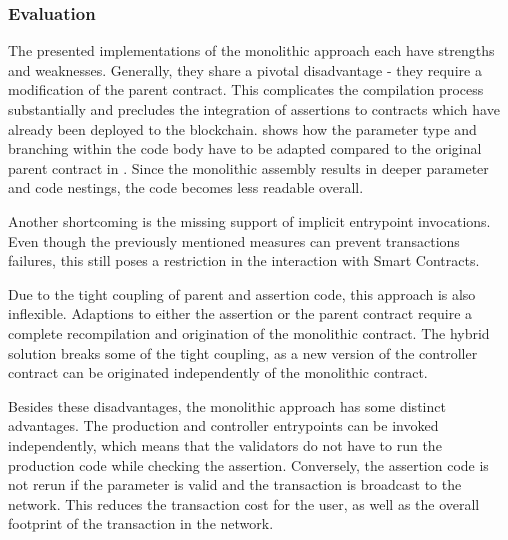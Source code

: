 \subsubsection{Evaluation}
The presented implementations of the monolithic approach each have strengths and weaknesses. Generally, they share a pivotal disadvantage - they require a modification of the parent contract. This complicates the compilation process substantially and precludes the integration of assertions to contracts which have already been deployed to the blockchain.  shows how the parameter type and branching within the code body have to be adapted compared to the original parent contract in . Since the monolithic assembly results in deeper parameter and code nestings, the code becomes less readable overall.


Another shortcoming is the missing support of implicit entrypoint invocations. Even though the previously mentioned measures can prevent transactions failures, this still poses a restriction in the interaction with Smart Contracts. 

Due to the tight coupling of parent and assertion code, this approach is also inflexible. Adaptions to either the assertion or the parent contract require a complete recompilation and origination of the monolithic contract. The hybrid solution breaks some of the tight coupling, as a new version of the controller contract can be originated independently of the monolithic contract.



Besides these disadvantages, the monolithic approach has some distinct advantages. The production and controller entrypoints can be invoked independently, which means that the validators do not have to run the production code while checking the assertion. Conversely, the assertion code is not rerun if the parameter is valid and the transaction is broadcast to the network. This reduces the transaction cost for the user, as well as the overall footprint of the transaction in the network.

